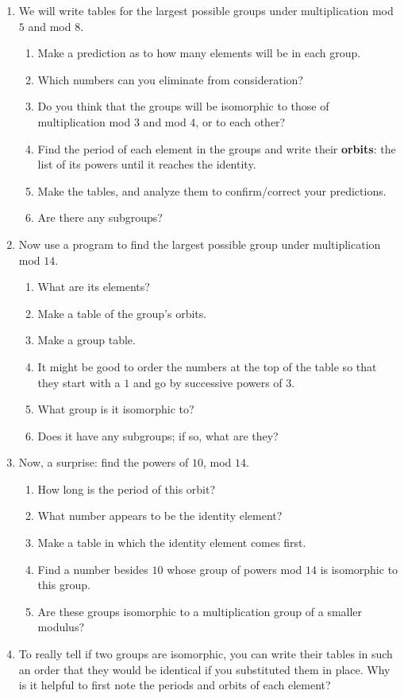 \documentclass[../gatm.tex]{subfiles}
\begin{document}
\begin{enumerate}
\setcounter{enumi}{\value{problem_i}}
\item We will write tables for the largest possible groups under multiplication mod $5$ and mod $8$.
\begin{enumerate}
\item Make a prediction as to how many elements will be in each group.
\item Which numbers can you eliminate from consideration?
\item Do you think that the groups will be isomorphic to those of multiplication mod $3$ and mod $4$, or to each other?
\item Find the period of each element in the groups and write their \textbf{orbits}: the list of its powers until it reaches the identity.
\item Make the tables, and analyze them to confirm/correct your predictions.
\item Are there any subgroups?
\end{enumerate}
\item Now use a program to find the largest possible group under multiplication mod $14$.
\begin{enumerate}
\item What are its elements?
\item Make a table of the group's orbits.
\item Make a group table.
\item It might be good to order the numbers at the top of the table so that they start with a $1$ and go by successive powers of $3$.
\item What group is it isomorphic to?
\item Does it have any subgroups; if so, what are they?
\end{enumerate}
\item Now, a surprise: find the powers of $10$, mod $14$.
\begin{enumerate}
\item How long is the period of this orbit?
\item What number appears to be the identity element?
\item Make a table in which the identity element comes first.
\item Find a number besides $10$ whose group of powers mod $14$ is isomorphic to this group.
\item Are these groups isomorphic to a multiplication group of a smaller modulus?
\end{enumerate}
\item To really tell if two groups are isomorphic, you can write their tables in such an order that they would be identical if you substituted them in place. Why is it helpful to first note the periods and orbits of each element?
\setcounter{problem_i}{\value{enumi}}
\end{enumerate}
\end{document}

